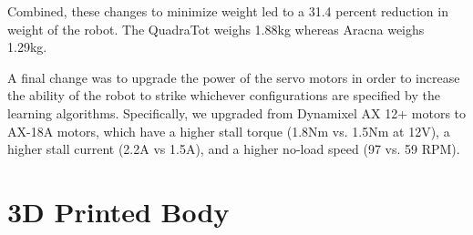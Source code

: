 \documentclass[letterpaper]{article}
\begin{document}
Combined, these changes to minimize weight led to a 31.4 percent reduction in weight of the robot. The QuadraTot weighs 1.88kg whereas Aracna weighs 1.29kg.

A final change was to upgrade the power of the servo motors in order to increase the ability of the robot to strike whichever configurations are specified by the learning algorithms. Specifically, we upgraded from Dynamixel AX 12+ motors to AX-18A motors, which have a higher stall torque (1.8Nm vs. 1.5Nm at 12V), a higher stall current (2.2A vs 1.5A), and a higher no-load speed (97 vs. 59 RPM).







\section{3D Printed Body}
\end{document}
